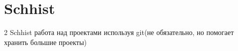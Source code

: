 \chapter{Schhist}\label{kicad:schhist}
2 Schhist работа над проектами используя git(не обязательно, но помогает хранить большие проекты)
